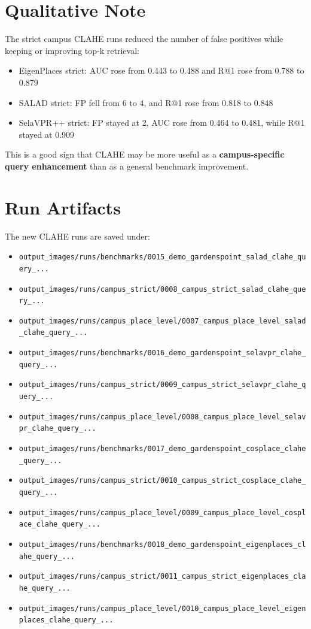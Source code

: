 \documentclass[11pt]{article}
\begin{document}
\section*{Qualitative Note}
The strict campus CLAHE runs reduced the number of false positives while keeping or improving top-k retrieval:
\begin{itemize}[leftmargin=*]
  \item EigenPlaces strict: AUC rose from 0.443 to 0.488 and R@1 rose from 0.788 to 0.879
  \item SALAD strict: FP fell from 6 to 4, and R@1 rose from 0.818 to 0.848
  \item SelaVPR++ strict: FP stayed at 2, AUC rose from 0.464 to 0.481, while R@1 stayed at 0.909
\end{itemize}

This is a good sign that CLAHE may be more useful as a \textbf{campus-specific query enhancement} than as a general benchmark improvement.

\section*{Run Artifacts}
The new CLAHE runs are saved under:
\begin{itemize}[leftmargin=*]
  \item \texttt{output\_images/runs/benchmarks/0015\_demo\_gardenspoint\_salad\_clahe\_query\_...}
  \item \texttt{output\_images/runs/campus\_strict/0008\_campus\_strict\_salad\_clahe\_query\_...}
  \item \texttt{output\_images/runs/campus\_place\_level/0007\_campus\_place\_level\_salad\_clahe\_query\_...}
  \item \texttt{output\_images/runs/benchmarks/0016\_demo\_gardenspoint\_selavpr\_clahe\_query\_...}
  \item \texttt{output\_images/runs/campus\_strict/0009\_campus\_strict\_selavpr\_clahe\_query\_...}
  \item \texttt{output\_images/runs/campus\_place\_level/0008\_campus\_place\_level\_selavpr\_clahe\_query\_...}
  \item \texttt{output\_images/runs/benchmarks/0017\_demo\_gardenspoint\_cosplace\_clahe\_query\_...}
  \item \texttt{output\_images/runs/campus\_strict/0010\_campus\_strict\_cosplace\_clahe\_query\_...}
  \item \texttt{output\_images/runs/campus\_place\_level/0009\_campus\_place\_level\_cosplace\_clahe\_query\_...}
  \item \texttt{output\_images/runs/benchmarks/0018\_demo\_gardenspoint\_eigenplaces\_clahe\_query\_...}
  \item \texttt{output\_images/runs/campus\_strict/0011\_campus\_strict\_eigenplaces\_clahe\_query\_...}
  \item \texttt{output\_images/runs/campus\_place\_level/0010\_campus\_place\_level\_eigenplaces\_clahe\_query\_...}
\end{itemize}
\end{document}
